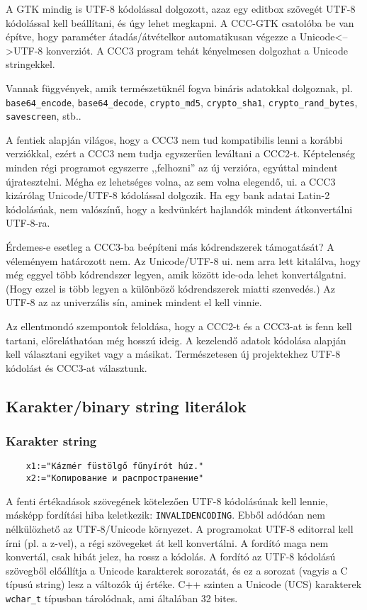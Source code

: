 A GTK mindig is UTF-8 kódolással dolgozott, azaz egy editbox
szövegét UTF-8 kódolással kell beállítani, és úgy lehet megkapni.
A CCC-GTK csatolóba be van építve, hogy paraméter átadás/átvételkor
automatikusan végezze a Unicode<-->UTF-8 konverziót.
A CCC3 program tehát kényelmesen dolgozhat a Unicode
stringekkel.

Vannak függvények, amik természetüknél fogva bináris
adatokkal dolgoznak, pl. 
\verb!base64_encode!,
\verb!base64_decode!, 
\verb!crypto_md5!, 
\verb!crypto_sha1!,
\verb!crypto_rand_bytes!,
\verb!savescreen!, stb..


A fentiek alapján világos, 
hogy a CCC3 nem tud kompatibilis lenni a korábbi verziókkal,
ezért a CCC3 nem tudja egyszerűen leváltani a CCC2-t. 
Képtelenség minden régi programot egyszerre ,,felhozni'' az új verzióra, 
egyúttal mindent újratesztelni. Mégha ez lehetséges  volna,
az sem volna elegendő, ui. a  CCC3  kizárólag  Unicode/UTF-8
kódolással dolgozik. Ha egy bank adatai Latin-2 kódolásúak, nem valószínű, 
hogy a kedvünkért hajlandók mindent átkonvertálni UTF-8-ra.

Érdemes-e esetleg a CCC3-ba beépíteni más kódrendszerek támogatását?
A véleményem határozott nem. Az Unicode/UTF-8 ui. nem arra lett kitalálva,
hogy még eggyel több kódrendszer legyen, amik között ide-oda lehet
konvertálgatni. (Hogy ezzel is több legyen a különböző kódrendszerek
miatti szenvedés.) Az UTF-8 az az univerzális sín, aminek mindent el kell vinnie.


Az ellentmondó szempontok feloldása, hogy a CCC2-t és a CCC3-at
is fenn kell tartani, előreláthatóan még hosszú ideig. A kezelendő
adatok kódolása alapján kell választani egyiket vagy a másikat.
Természetesen új projektekhez UTF-8 kódolást és CCC3-at választunk.




\subsection{Karakter/binary string literálok}

\subsubsection{Karakter string}
\begin{verbatim}
    x1:="Kázmér füstölgő fűnyírót húz."
    x2:="Копирование и распространение"
\end{verbatim}
A fenti értékadások  szövegének
kötelezően UTF-8 kódolásúnak kell lennie, másképp fordítási hiba
keletkezik: \verb!INVALIDENCODING!. Ebből adódóan nem nélkülözhető
az UTF-8/Unicode környezet.
A programokat UTF-8 editorral kell írni (pl. a z-vel),
a régi szövegeket át kell konvertálni. A fordító maga nem konvertál,
csak hibát jelez, ha rossz a kódolás. A fordító az UTF-8 kódolású
szövegből előállítja a Unicode karakterek sorozatát, és ez a sorozat 
(vagyis a C típusú string) lesz a változók új értéke.
C++ szinten a Unicode (UCS) karakterek \verb!wchar_t! 
típusban tárolódnak, ami általában 32 bites. 


